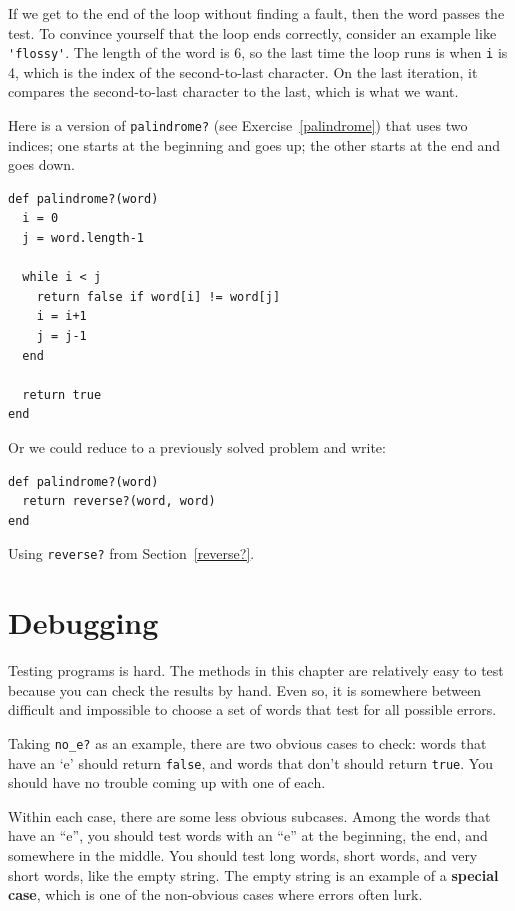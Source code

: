 \documentclass[10pt]{book}
\begin{document}
If we get to the end of the loop without finding a fault, then the
word passes the test.  To convince yourself that the loop ends
correctly, consider an example like \verb"'flossy'".  The
length of the word is 6, so
the last time the loop runs is when {\tt i} is 4, which is the
index of the second-to-last character.  On the last iteration,
it compares the second-to-last character to the last, which is
what we want.

Here is a version of \verb"palindrome?" (see
Exercise~\ref{palindrome}) that uses two indices; one starts at the
beginning and goes up; the other starts at the end and goes down.

\begin{verbatim}
def palindrome?(word)
  i = 0
  j = word.length-1

  while i < j
    return false if word[i] != word[j]
    i = i+1
    j = j-1
  end

  return true
end
\end{verbatim}

Or we could reduce to a previously solved
problem and write:

\begin{verbatim}
def palindrome?(word)
  return reverse?(word, word)
end
\end{verbatim}
%
Using \verb"reverse?" from Section~\ref{reverse?}.


\section{Debugging}

Testing programs is hard.  The methods in this chapter are
relatively easy to test because you can check the results by hand.
Even so, it is somewhere between difficult and impossible to choose a
set of words that test for all possible errors.

Taking \verb"no_e?" as an example, there are two obvious
cases to check: words that have an `e' should return {\tt false}, and
words that don't should return {\tt true}.  You should have no
trouble coming up with one of each.

Within each case, there are some less obvious subcases.  Among the
words that have an ``e'', you should test words with an ``e'' at the
beginning, the end, and somewhere in the middle.  You should test long
words, short words, and very short words, like the empty string.  The
empty string is an example of a {\bf special case}, which is one of
the non-obvious cases where errors often lurk.
\end{document}

